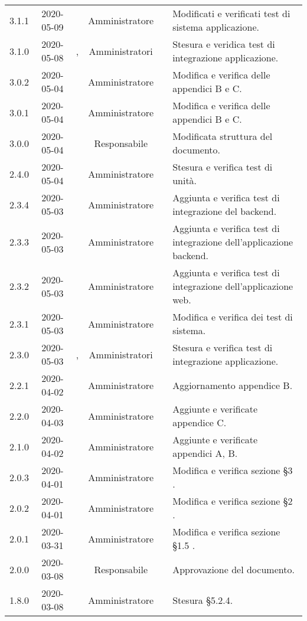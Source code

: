 {\begin{longtable}{ c c  C{2.3cm} c C{3cm} C{3.2cm}}
3.1.1 & 2020-05-09 & \MC{} & Amministratore & \SE{} & Modificati e verificati test di sistema applicazione. \\
3.1.0 & 2020-05-08 & \MC{}, \DF{} & Amministratori & \AT{} & Stesura e veridica test di integrazione applicazione. \\
3.0.2 & 2020-05-04 & \PF{} & Amministratore & \AT{} & Modifica e verifica delle appendici B e C. \\
3.0.1 & 2020-05-04 & \PF{} & Amministratore & \AT{} & Modifica e verifica delle appendici B e C. \\
3.0.0 & 2020-05-04 & \DF{} & Responsabile	& \PF{} & Modificata struttura del documento.\\
2.4.0 & 2020-05-04 & \PF{} & Amministratore & \AT{} & Stesura e verifica test di unità. \\
2.3.4 & 2020-05-03 & \CE{} & Amministratore & \AT{} & Aggiunta e verifica test di integrazione del backend. \\
2.3.3 & 2020-05-03 & \PF{} & Amministratore & \AT{} & Aggiunta e verifica test di integrazione dell'applicazione backend. \\
2.3.2 & 2020-05-03 & \PF{} & Amministratore & \AT{} & Aggiunta e verifica test di integrazione dell'applicazione web. \\
2.3.1 & 2020-05-03 & \MC{} & Amministratore & \AT{} & Modifica e verifica dei test di sistema. \\
2.3.0 & 2020-05-03 & \MC{}, \DF{} & Amministratori & \AT{} & Stesura e verifica test di integrazione applicazione. \\
2.2.1 & 2020-04-02 & \PF{} & Amministratore & \AT{} & Aggiornamento appendice B.\\
2.2.0 & 2020-04-03 & \PF{} & Amministratore & \AT{} & Aggiunte e verificate appendice C.\\
2.1.0 & 2020-04-02 & \PF{} & Amministratore & \AT{} & Aggiunte e verificate appendici A, B.\\
2.0.3 & 2020-04-01 & \PF{} & Amministratore & \AT{} & Modifica e verifica sezione §3 .\\
2.0.2 & 2020-04-01 & \PF{} & Amministratore & \AT{} & Modifica e verifica sezione §2 .\\
2.0.1 & 2020-03-31 & \PF{} & Amministratore & \AT{} & Modifica e verifica sezione §1.5 .\\
2.0.0 & 2020-03-08 & \BR{} & Responsabile & \DF{}& Approvazione del documento. \\
1.8.0 & 2020-03-08 & \PF{} & Amministratore & \AT{} & Stesura §5.2.4. \\

\end{longtable}}
